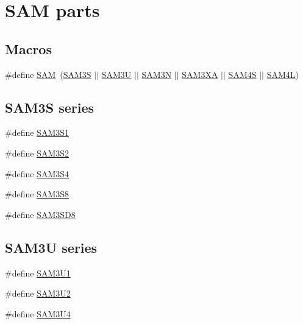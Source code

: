 \hypertarget{group__sam__part__macros__group}{\section{S\-A\-M parts}
\label{group__sam__part__macros__group}
}
\subsection*{Macros}
\begin{DoxyCompactItemize}
\item 
\#define \hyperlink{group__sam__part__macros__group_ga0184d5fd98854f0e40eef3a27de91fed}{S\-A\-M}~(\hyperlink{group__sam__part__macros__group_gaaa8d9ee5981c67997fbdf923247bcb68}{S\-A\-M3\-S} $|$$|$ \hyperlink{group__sam__part__macros__group_ga987abac1ef39b0b447b8b11419942476}{S\-A\-M3\-U} $|$$|$ \hyperlink{group__sam__part__macros__group_ga52239420b96aa3f1a273665cfd3b60a1}{S\-A\-M3\-N} $|$$|$ \hyperlink{group__sam__part__macros__group_gaae4990dfaa4eeed17d8a0351cca02fdd}{S\-A\-M3\-X\-A} $|$$|$ \hyperlink{group__sam__part__macros__group_gac3e6ef71bec5113415a64bb14ce8be24}{S\-A\-M4\-S} $|$$|$ \hyperlink{group__sam__part__macros__group_gabf4b4fa802cbb57480225dd3c8f7a41b}{S\-A\-M4\-L})
\end{DoxyCompactItemize}
\subsection*{S\-A\-M3\-S series}
\begin{DoxyCompactItemize}
\item 
\#define \hyperlink{group__sam__part__macros__group_gac1f138c6fe48b20faa71fb2d68d68b52}{S\-A\-M3\-S1}
\item 
\#define \hyperlink{group__sam__part__macros__group_ga3665c1cc7fa5ad33231fde9e16b562cd}{S\-A\-M3\-S2}
\item 
\#define \hyperlink{group__sam__part__macros__group_gae92413f616568bd2f38622e20f4925e0}{S\-A\-M3\-S4}
\item 
\#define \hyperlink{group__sam__part__macros__group_gaea8f1cca303520385d12110ad8e8bafe}{S\-A\-M3\-S8}
\item 
\#define \hyperlink{group__sam__part__macros__group_ga9f16069247b2e38ddb0bcaa912750a4f}{S\-A\-M3\-S\-D8}
\end{DoxyCompactItemize}
\subsection*{S\-A\-M3\-U series}
\begin{DoxyCompactItemize}
\item 
\#define \hyperlink{group__sam__part__macros__group_gae39c5d03b1af93b2864e5f72908a0ff3}{S\-A\-M3\-U1}
\item 
\#define \hyperlink{group__sam__part__macros__group_ga0feb884f39921517436f269c86914cb0}{S\-A\-M3\-U2}
\item 
\#define \hyperlink{group__sam__part__macros__group_ga2af1cda107cbae1f393bce7a6c659a98}{S\-A\-M3\-U4}
\end{DoxyCompactItemize}
